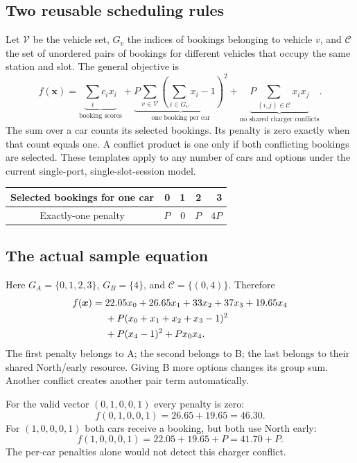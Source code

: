 \subsection{Two reusable scheduling rules}
Let $\mathcal V$ be the vehicle set, $G_v$ the indices of bookings belonging to
vehicle $v$, and $\mathcal C$ the set of unordered pairs of bookings for different
vehicles that occupy the same station and slot. The general objective is
\begin{equation}\label{eq:general-qubo}
f(\boldsymbol{x})=
\underbrace{\sum_i c_i x_i}_{\text{booking scores}}
+\underbrace{P\sum_{v\in\mathcal V}\left(\sum_{i\in G_v}x_i-1\right)^2}_{\text{one booking per car}}
+\underbrace{P\sum_{(i,j)\in\mathcal C}x_i x_j}_{\text{no shared charger conflicts}}.
\end{equation}
The sum over a car counts its selected bookings. Its penalty is zero exactly
when that count equals one. A conflict product is one only if both conflicting
bookings are selected. These templates apply to any number of cars and options
under the current single-port, single-slot-session model.

\begin{center}
\begin{tabular}{crrrr}
\toprule
Selected bookings for one car & 0 & 1 & 2 & 3\\
\midrule
Exactly-one penalty & $P$ & $0$ & $P$ & $4P$\\
\bottomrule
\end{tabular}
\end{center}

\subsection{The actual sample equation}
Here $G_A=\{0,1,2,3\}$, $G_B=\{4\}$, and $\mathcal C=\{(0,4)\}$. Therefore
\begin{align}\label{eq:sample-qubo}
f(\boldsymbol{x})={}&22.05x_0+26.65x_1+33x_2+37x_3+19.65x_4\notag\\
&+P(x_0+x_1+x_2+x_3-1)^2\notag\\
&+P(x_4-1)^2+Px_0x_4.
\end{align}
The first penalty belongs to A; the second belongs to B; the last belongs to
their shared North/early resource. Giving B more options changes its group sum.
Another conflict creates another pair term automatically.

For the valid vector $(0,1,0,0,1)$ every penalty is zero:
\begin{equation}
f(0,1,0,0,1)=26.65+19.65=46.30.
\end{equation}
For $(1,0,0,0,1)$ both cars receive a booking, but both use North early:
\begin{equation}
f(1,0,0,0,1)=22.05+19.65+P=41.70+P.
\end{equation}
The per-car penalties alone would not detect this charger conflict.

